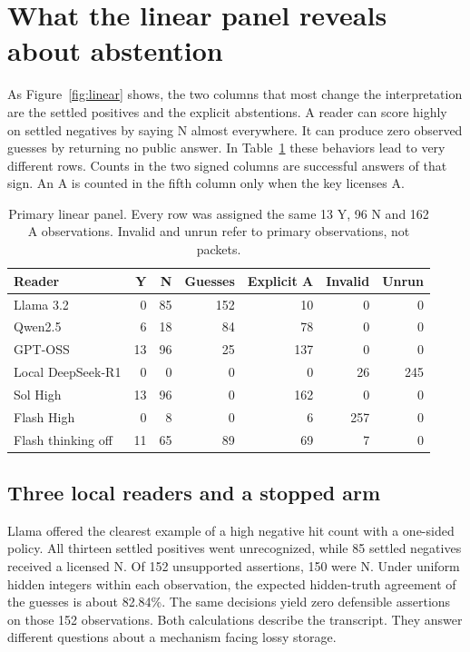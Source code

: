 \documentclass[12pt,letterpaper]{article}
\begin{document}
\section{What the linear panel reveals about abstention}\label{sec:linear}
As Figure~\ref{fig:linear} shows, the two columns that most change the interpretation are the settled positives and the explicit abstentions. A reader can score highly on settled negatives by saying N almost everywhere. It can produce zero observed guesses by returning no public answer. In Table~\ref{tab:linear} these behaviors lead to very different rows. Counts in the two signed columns are successful answers of that sign. An A is counted in the fifth column only when the key licenses A.
\begin{table}[htbp]\centering\small
\caption{Primary linear panel. Every row was assigned the same 13 Y, 96 N and 162 A observations. Invalid and unrun refer to primary observations, not packets.}\label{tab:linear}
\begin{tabular}{@{}lrrrrrr@{}}\toprule
Reader & Y & N & Guesses & Explicit A & Invalid & Unrun\\\midrule
Llama 3.2 &0&85&152&10&0&0\\
Qwen2.5 &6&18&84&78&0&0\\
GPT-OSS &13&96&25&137&0&0\\
Local DeepSeek-R1 &0&0&0&0&26&245\\\midrule
Sol High &13&96&0&162&0&0\\
Flash High &0&8&0&6&257&0\\
Flash thinking off &11&65&89&69&7&0\\\bottomrule
\end{tabular}
\end{table}

\subsection{Three local readers and a stopped arm}
Llama offered the clearest example of a high negative hit count with a one-sided policy. All thirteen settled positives went unrecognized, while 85 settled negatives received a licensed N. Of 152 unsupported assertions, 150 were N. Under uniform hidden integers within each observation, the expected hidden-truth agreement of the guesses is about 82.84\%. The same decisions yield zero defensible assertions on those 152 observations. Both calculations describe the transcript. They answer different questions about a mechanism facing lossy storage.
\end{document}

